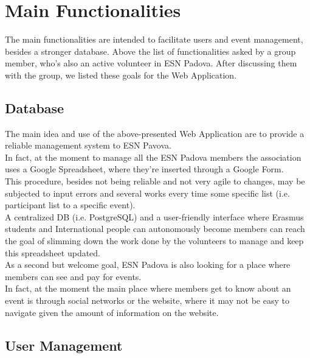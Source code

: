 \section{Main Functionalities}

The main functionalities are intended to facilitate users and event management, besides a stronger database.
Above the list of functionalities asked by a group member, who's also an active volunteer in ESN Padova.
After discussing them with the group, we listed these goals for the Web Application.

\subsection{Database}

The main idea and use of the above-presented Web Application are to provide a reliable management system to ESN Pavova. \\
In fact, at the moment to manage all the ESN Padova members the association uses a Google Spreadsheet, where they're inserted 
through a Google Form. \\
This procedure, besides not being reliable and not very agile to changes, may be subjected to input errors and several works 
every time some specific list (i.e. participant list to a specific event).\\
A centralized DB (i.e. PostgreSQL) and a user-friendly interface where Erasmus students and International people can autonomously 
become members can reach the goal of slimming down the work done by the volunteers to manage and keep this spreadsheet updated.\\
As a second but welcome goal, ESN Padova is also looking for a place where members can see and pay for events.\\
In fact, at the moment the main place where members get to know about an event is through social networks or the website, where it
may not be easy to navigate given the amount of information on the website.


\subsection{User Management}

